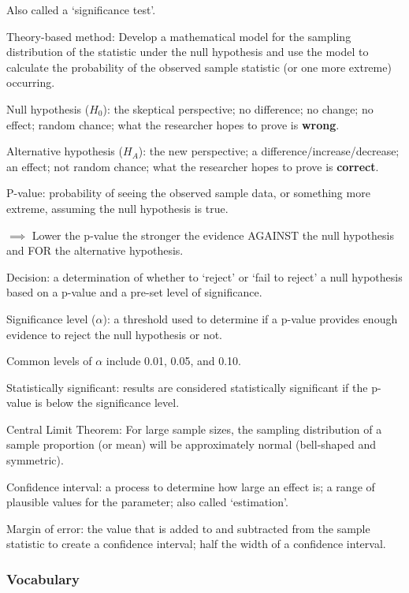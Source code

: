 \documentclass[
]{report}
\newcommand{\rgi}{\hspace{24pt}}  %
\begin{document}
\rgi Also called a `significance test'.

Theory-based method: Develop a mathematical model for the sampling distribution of the statistic under the null hypothesis and use the model to calculate the probability of the observed sample statistic (or one more extreme) occurring.

Null hypothesis (\(H_0\)): the skeptical perspective; no difference; no change; no effect; random chance; what the researcher hopes to prove is \textbf{wrong}.

Alternative hypothesis (\(H_A\)): the new perspective; a difference/increase/decrease; an effect; not random chance; what the researcher hopes to prove is \textbf{correct}.

P-value: probability of seeing the observed sample data, or something more extreme, assuming the null hypothesis is true.

\(\implies\) Lower the p-value the stronger the evidence AGAINST the null hypothesis and FOR the alternative hypothesis.

Decision: a determination of whether to `reject' or `fail to reject' a null hypothesis based on a p-value and a pre-set level of significance.

Significance level (\(\alpha\)): a threshold used to determine if a p-value provides enough evidence to reject the null hypothesis or not.

\rgi Common levels of \(\alpha\) include 0.01, 0.05, and 0.10.

Statistically significant: results are considered statistically significant if the p-value is below the significance level.

Central Limit Theorem: For large sample sizes, the sampling distribution of a sample proportion (or mean) will be approximately normal (bell-shaped and symmetric).

Confidence interval: a process to determine how large an effect is; a range of plausible values for the parameter; also called `estimation'.

Margin of error: the value that is added to and subtracted from the sample statistic to create a confidence interval; half the width of a confidence interval.

\hypertarget{vocabulary-14}{%
\subsubsection*{Vocabulary}\label{vocabulary-14}}
\end{document}
